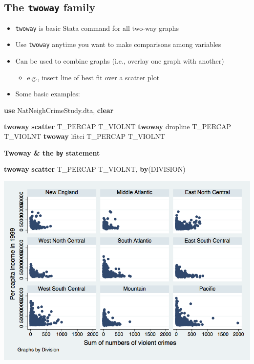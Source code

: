 \documentclass[
]{book}
\newenvironment{Shaded}{\begin{snugshade}}{\end{snugshade}}
\newcommand{\BaseNTok}[1]{\textcolor[rgb]{0.00,0.00,0.81}{#1}}
\newcommand{\KeywordTok}[1]{\textcolor[rgb]{0.13,0.29,0.53}{\textbf{#1}}}
\newcommand{\NormalTok}[1]{#1}
\providecommand{\tightlist}{%
  \setlength{\itemsep}{0pt}\setlength{\parskip}{0pt}}
\begin{document}
\hypertarget{the-twoway-family}{%
\subsection{\texorpdfstring{The \texttt{twoway} family}{The twoway family}}\label{the-twoway-family}}

\begin{itemize}
\tightlist
\item
  \texttt{twoway} is basic Stata command for all two-way graphs
\item
  Use \texttt{twoway} anytime you want to make comparisons among variables
\item
  Can be used to combine graphs (i.e., overlay one graph with another)

  \begin{itemize}
  \tightlist
  \item
    e.g., insert line of best fit over a scatter plot
  \end{itemize}
\item
  Some basic examples:
\end{itemize}

\begin{Shaded}
\begin{Highlighting}[]
\KeywordTok{use}\NormalTok{ NatNeighCrimeStudy.dta, }\KeywordTok{clear}

\KeywordTok{twoway} \KeywordTok{scatter}\NormalTok{ T\_PERCAP T\_VIOLNT}
\KeywordTok{twoway} \BaseNTok{dropline}\NormalTok{ T\_PERCAP T\_VIOLNT}
\KeywordTok{twoway}\NormalTok{ lfitci T\_PERCAP T\_VIOLNT}
\end{Highlighting}
\end{Shaded}

\textbf{Twoway \& the \texttt{by} statement}

\begin{Shaded}
\begin{Highlighting}[]
\KeywordTok{twoway} \KeywordTok{scatter}\NormalTok{ T\_PERCAP T\_VIOLNT, }\KeywordTok{by}\NormalTok{(DIVISION)}
\end{Highlighting}
\end{Shaded}

\includegraphics{Stata/StataGraphics/images/twowayby.png}
\end{document}
